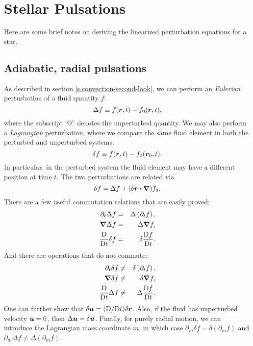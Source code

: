 
\chapter{Stellar Pulsations}\label{s.pulsations}

Here are some brief notes on deriving the linearized perturbation equations for a star.

\section{Adiabatic, radial pulsations}\label{s.adiabatic-radial}
As described in section \ref{s.convection-second-look}, we can perform an \emph{Eulerian} perturbation of a fluid quantity $f$:
\begin{equation}
  \Delta f \equiv f(\boldsymbol{r},t)-f_{0}(\boldsymbol{r},t),
\end{equation}
where the subscript ``0'' denotes the unperturbed quantity. We may also perform a \emph{Lagrangian} perturbation, where we compare the same fluid element in both the perturbed and unperturbed systems:
\begin{equation}
 \delta f \equiv f(\boldsymbol{r},t) - f_{0}(\boldsymbol{r}_{0},t).
\end{equation}
In particular, in the perturbed system the fluid element may have a different position at time $t$.
The two perturbations are related via
\begin{equation}
\delta f = \Delta f + (\delta\boldsymbol{r}\boldsymbol{\cdot}\boldsymbol{\nabla})f_{0}.
\end{equation}
There are a few useful commutation relations that are easily proved:
\begin{eqnarray}
\partial_{t}\Delta f &=& \Delta\left(\partial_{t}f\right),\\
\boldsymbol{\nabla} \Delta f &=& \Delta \boldsymbol{\nabla} f,\\
\frac{\mathrm{D}}{\mathrm{D} t}\delta f &=& \delta \frac{\mathrm{D} f}{\mathrm{D} t}.
\end{eqnarray}
And there are operations that do not commute:
\begin{eqnarray}
\partial_{t}\delta f &\neq& \delta\left(\partial_{t}f\right),\\
\boldsymbol{\nabla} \delta f &\neq& \delta \boldsymbol{\nabla} f,\\
\frac{\mathrm{D}}{\mathrm{D} t}\Delta f &\neq& \Delta \frac{\mathrm{D} f}{\mathrm{D} t}.
\end{eqnarray}
One can further show that $\delta\boldsymbol{u} = (\mathrm{D}/\mathrm{D} t)\delta \boldsymbol{r}$. Also, if the fluid has unperturbed velocity $\boldsymbol{u} = 0$, then $\Delta \boldsymbol{u} = \delta \boldsymbol{u}$.  Finally, for purely radial motion, we can introduce the Lagrangian mass coordinate $m$, in which case $\partial_{m}\delta f = \delta(\partial_{m}f)$ and $\partial_{m}\Delta f \neq \Delta(\partial_{m}f)$.

